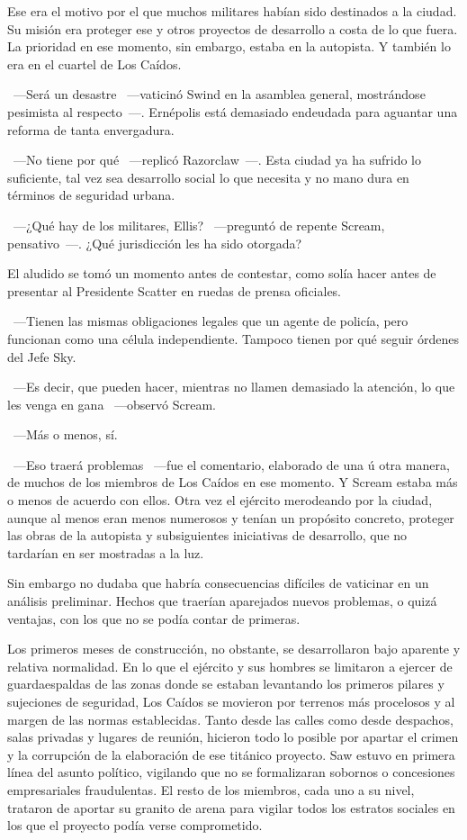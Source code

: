 Ese era el motivo por el que muchos militares habían sido destinados a la ciudad. Su misión era proteger ese y otros proyectos de desarrollo a costa de lo que fuera. La prioridad en ese momento, sin embargo, estaba en la autopista. Y también lo era en el cuartel de Los Caídos.

~---Será un desastre ~---vaticinó Swind en la asamblea general, mostrándose pesimista al respecto~---. Ernépolis está demasiado endeudada para aguantar una reforma de tanta envergadura.

~---No tiene por qué ~---replicó Razorclaw~---. Esta ciudad ya ha sufrido lo suficiente, tal vez sea desarrollo social lo que necesita y no mano dura en términos de seguridad urbana.

~---¿Qué hay de los militares, Ellis? ~---preguntó de repente Scream, pensativo~---. ¿Qué jurisdicción les ha sido otorgada?

El aludido se tomó un momento antes de contestar, como solía hacer antes de presentar al Presidente Scatter en ruedas de prensa oficiales.

~---Tienen las mismas obligaciones legales que un agente de policía, pero funcionan como una célula independiente. Tampoco tienen por qué seguir órdenes del Jefe Sky.

~---Es decir, que pueden hacer, mientras no llamen demasiado la atención, lo que les venga en gana ~---observó Scream.

~---Más o menos, sí.

~---Eso traerá problemas ~---fue el comentario, elaborado de una ú otra manera, de muchos de los miembros de Los Caídos en ese momento. Y Scream estaba más o menos de acuerdo con ellos. Otra vez el ejército merodeando por la ciudad, aunque al menos eran menos numerosos y tenían un propósito concreto, proteger las obras de la autopista y subsiguientes iniciativas de desarrollo, que no tardarían en ser mostradas a la luz.

Sin embargo no dudaba que habría consecuencias difíciles de vaticinar en un análisis preliminar. Hechos que traerían aparejados nuevos problemas, o quizá ventajas, con los que no se podía contar de primeras.

Los primeros meses de construcción, no obstante, se desarrollaron bajo aparente y relativa normalidad. En lo que el ejército y sus hombres se limitaron a ejercer de guardaespaldas de las zonas donde se estaban levantando los primeros pilares y sujeciones de seguridad, Los Caídos se movieron por terrenos más procelosos y al margen de las normas establecidas. Tanto desde las calles como desde despachos, salas privadas y lugares de reunión, hicieron todo lo posible por apartar el crimen y la corrupción de la elaboración de ese titánico proyecto. Saw estuvo en primera línea del asunto político, vigilando que no se formalizaran sobornos o concesiones empresariales fraudulentas. El resto de los miembros, cada uno a su nivel, trataron de aportar su granito de arena para vigilar todos los estratos sociales en los que el proyecto podía verse comprometido.

